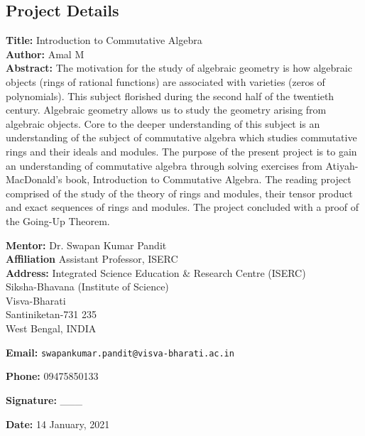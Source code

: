 \documentclass[]{article}
\begin{document}
\subsection*{Project Details}

\textbf{Title:} Introduction to Commutative Algebra \\
\textbf{Author:} Amal M \\
\textbf{Abstract:} The motivation for the study of algebraic geometry is how algebraic objects (rings of rational functions) are associated with varieties (zeros of polynomials). This subject florished during the second half of the twentieth century. Algebraic geometry allows us to study the geometry arising from algebraic objects. Core to the deeper understanding of this subject is an understanding of the subject of commutative algebra which studies commutative rings and their ideals and modules. The purpose of the present project is to gain an understanding of commutative algebra through solving exercises from Atiyah-MacDonald's book, Introduction to Commutative Algebra. The reading project comprised of the study of the theory of rings and modules, their tensor product and exact sequences of rings and modules. The project concluded with a proof of the Going-Up Theorem.


\begin{table}
    \textbf{Mentor:} Dr. Swapan Kumar Pandit \\
    \textbf{Affiliation} Assistant Professor, ISERC \\
\textbf{Address: } Integrated Science Education \& Research Centre (ISERC) \\
Siksha-Bhavana (Institute of Science) \\
Visva-Bharati \\
Santiniketan-731 235 \\
West Bengal, INDIA

\textbf{Email:} \texttt{swapankumar.pandit@visva-bharati.ac.in}

\textbf{Phone:} 09475850133
   

\textbf{Signature:} \_\_\_

\textbf{Date:} 14 January, 2021
\end{table}
\end{document}
